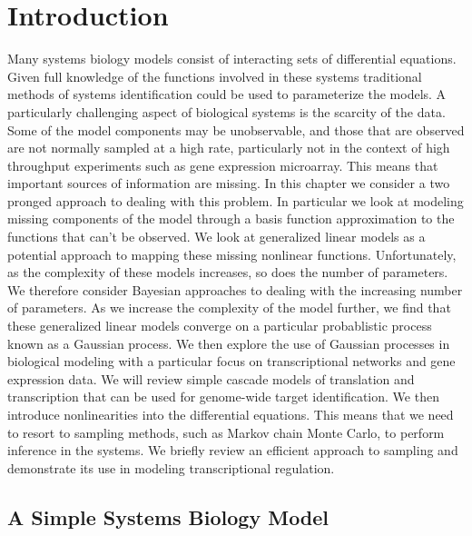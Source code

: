 \documentclass{article}
\begin{document}
\section{Introduction}

Many systems biology models consist of interacting sets of
differential equations. Given full knowledge of the functions
involved in these systems traditional methods of systems
identification could be used to parameterize the models. A
particularly challenging aspect of biological systems is the
scarcity of the data. Some of the model components may be
unobservable, and those that are observed are not normally
sampled at a high rate, particularly not in the context of high
throughput experiments such as gene expression microarray. This
means that important sources of information are missing. In this
chapter we consider a two pronged approach to dealing with this
problem. In particular we look at modeling missing components of
the model through a basis function approximation to the functions
that can't be observed. We look at generalized linear models as a
potential approach to mapping these missing nonlinear
functions. Unfortunately, as the complexity of these models
increases, so does the number of parameters. We therefore
consider Bayesian approaches to dealing with the increasing
number of parameters. As we increase the complexity of the model
further, we find that these generalized linear models converge on
a particular probablistic process known as a Gaussian process. We
then explore the use of Gaussian processes in biological modeling
with a particular focus on transcriptional networks and gene
expression data. We will review simple cascade models of
translation and transcription that can be used for genome-wide
target identification. We then introduce nonlinearities into the
differential equations. This means that we need to resort to
sampling methods, such as Markov chain Monte Carlo, to perform
inference in the systems. We briefly review an efficient approach
to sampling and demonstrate its use in modeling transcriptional
regulation.

\subsection{A Simple Systems Biology Model}
\end{document}
